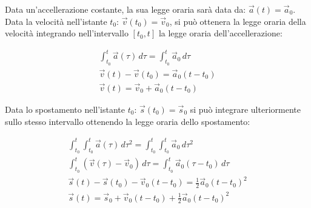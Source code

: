 \documentclass{article}
\numberwithin{equation}{subsection}
\begin{document}
\begin{center}\end{center}

Data un'accellerazione costante, la sua legge oraria sarà data 
da: $\vec{a}(t) = \vec{a}_0$.\\
Data la velocità nell'istante $t_0$: $\vec{v}(t_0) = \vec{v}_0$, si può 
ottenera la legge oraria della velocità integrando nell'intervallo $[t_0, t]$ 
la legge oraria dell'accellerazione:

\begin{gather}
    \int_{t_0}^{t} \vec{a}(\tau) \,d\tau = \int_{t_0}^{t}\vec{a}_0\,d\tau\\
    \vec{v}(t) - \vec{v}(t_0) = \vec{a}_0(t - t_0)\\
    \vec{v}(t) = \vec{v}_0 + \vec{a}_0(t - t_0)
\end{gather}

Data lo spostamento nell'istante $t_0$: $\vec{s}(t_0) = \vec{s}_0$ si può 
integrare ulteriormente sullo stesso intervallo ottenendo la 
legge oraria dello spostamento:

\begin{gather}
    \int_{t_0}^{t}\int_{t_0}^{t} \vec{a}(\tau) \,d\tau^{2} = \int_{t_0}^{t}\int_{t_0}^{t}\vec{a}_0\,d\tau^{2}\\
    \int_{t_0}^{t}(\vec{v}(\tau) - \vec{v}_0)\,d\tau = \int_{t_0}^{t}\vec{a}_0(\tau - t_0)\,d\tau\\
    \vec{s}(t) -\vec{s}(t_0) -\vec{v}_0(t-t_0) = \displaystyle\frac{1}{2}\vec{a}_0(t-t_0)^{2}\\
    \vec{s}(t) = \vec{s}_0 + \vec{v}_0(t - t_0) + \displaystyle\frac{1}{2}\vec{a}_0(t-t_0)^{2}
\end{gather}
\end{document}
